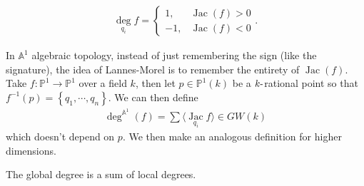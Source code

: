 \begin{align*}
\underset{q_i}\deg f = \begin{cases}
    1,  & \operatorname{Jac}(f) > 0 \\
    -1, & \operatorname{Jac}(f) < 0
\end{cases}
.\end{align*}

In \({\mathbb{A}}^1\) algebraic topology, instead of just remembering
the sign (like the signature), the idea of Lannes-Morel is to remember
the entirety of \(\operatorname{Jac}(f)\). Take
\(f: {\mathbb{P}}^1 \to {\mathbb{P}}^1\) over a field \(k\), then let
\(p\in {\mathbb{P}}^1(k)\) be a \(k{\hbox{-}}\)rational point so that
\(f^{-1}(p) = \left\{{q_1, \cdots, q_n}\right\}\). We can then define
\begin{align*}
\deg^{{\mathbb{A}}^1}(f) = \sum \langle \underset{q_i}{\operatorname{Jac}} f\rangle \in GW(k)
\end{align*}
which doesn't depend on \(p\). We then make an analogous definition for
higher dimensions.

\begin{proposition}[?]

The global degree is a sum of local degrees.

\end{proposition}

